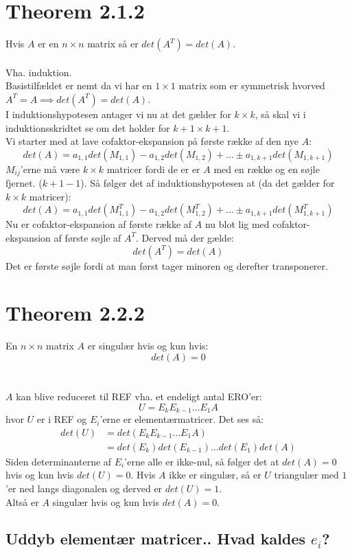 \documentclass[a4paper,oneside,article]{memoir}
\begin{document}
	\section{Theorem 2.1.2}
	Hvis $A$ er en $n\times n$ matrix så er $det(A^T)=det(A)$.
	\\
	\\
	Vha. induktion.\\
	Basistilfældet er nemt da vi har en $1 \times 1$ 
	matrix som er symmetrisk hvorved $A^T=A \implies 
	det(A^T)=det(A)$.\\
	I induktionshypotesen antager vi nu at det gælder 
	for $k \times k$, så  skal vi i induktionsskridtet 
	se om det holder for $k+1 \times k+1$.\\
	Vi starter med at lave cofaktor-ekspansion på første
	række af den nye $A$:
	$$det(A)=a_{1,1}det(M_{1,1})-a_{1,2}det(M_{1,2})+\dots 
	\pm a_{1,k+1}det(M_{1,k+1}) $$
	$M_{ij}$'erne må være $k \times k$ matricer fordi de
	er er $A$ med en række og en søjle fjernet. ($k+1-1$).
	Så følger det af induktionshypotesen at (da det gælder
	for $k \times k$ matricer):
	$$det(A)=a_{1,1}det(M_{1,1}^T)-a_{1,2}det(M_{1,2}^T)+\dots 
		\pm a_{1,k+1}det(M_{1,k+1}^T) $$
	Nu er cofaktor-ekspansion af første række af $A$ nu 
	blot lig med cofaktor-ekspansion af første søjle af
	$A^T$. Derved må der gælde:
	$$det(A^T)=det(A)$$
	Det er første søjle fordi at man først tager minoren
	og derefter transponerer.
	
	\section{Theorem 2.2.2}
	En $n \times n$ matrix $A$ er singulær hvis og kun hvis:
	$$det(A)=0$$
	\\
	\\
	$A$ kan blive reduceret til REF vha. et endeligt antal
	ERO'er:
	$$U=E_kE_{k-1}\dots E_1A$$
	hvor $U$ er i REF og $E_i$'erne er elementærmatricer. Det
	ses så:
	\begin{align*}
	det(U)&=det(E_kE_{k-1}\dots E_1A)\\
	&=det(E_k)det(E_{k-1})\dots det(E_1)det(A)
	\end{align*}
	Siden determinanterne af $E_i$'erne alle er ikke-nul, så
	følger det at $det(A)=0$ hvis og kun hvis $det(U)=0$.
	Hvis $A$ ikke er singulær, så er $U$ triangulær med $1$'er
	ned langs diagonalen og derved er $det(U)=1$.\\
	Altså er $A$ singulær hvis og kun hvis $det(A)=0$.
	
	\subsection*{Uddyb elementær matricer.. Hvad kaldes $e_i$?}
	
\end{document}
